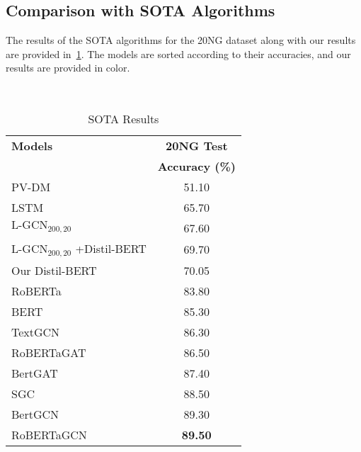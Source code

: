 \subsection{Comparison with SOTA Algorithms}\label{results:sota}
The results of the SOTA algorithms for the 20NG dataset along with our results are provided in~\cref{tab:results:sota}. The models are sorted according to their accuracies, and our results are provided in \textcolor{\resultcolor}{color}.
\begin{table}[ht]
    \centering{}
    \caption{SOTA Results}~\label{tab:results:sota}
    \begin{tabular}{lc}\toprule
        \textbf{Models}                                                  & \textbf{20NG Test}              \\
                                                                         & \textbf{Accuracy (\%)}          \\ \midrule
        PV-DM                                                            & 51.10                           \\
        LSTM                                                             & 65.70                           \\
        \textcolor{\resultcolor}{\(\text{L-GCN}_{200,20}\)}              & \textcolor{\resultcolor}{67.60} \\
        \textcolor{\resultcolor}{\(\text{L-GCN}_{200,20}\) +Distil-BERT} & \textcolor{\resultcolor}{69.70} \\
        \textcolor{\resultcolor}{Our Distil-BERT}                        & \textcolor{\resultcolor}{70.05} \\
        RoBERTa                                                          & 83.80                           \\
        BERT                                                             & 85.30                           \\
        TextGCN                                                          & 86.30                           \\
        RoBERTaGAT                                                       & 86.50                           \\
        BertGAT                                                          & 87.40                           \\
        SGC                                                              & 88.50                           \\
        BertGCN                                                          & 89.30                           \\
        RoBERTaGCN                                                       & \textbf{89.50}                  \\
        \bottomrule
    \end{tabular}
\end{table}

